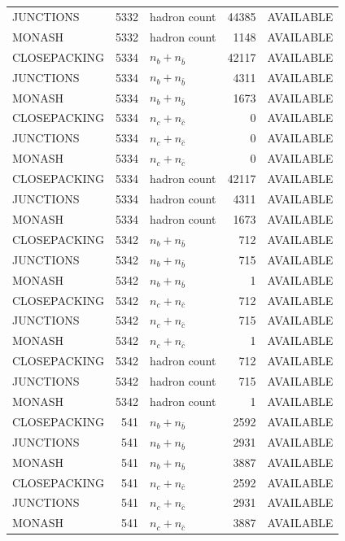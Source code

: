 \begin{landscape}
\begin{longtable}{@{}lrlrl@{}}
JUNCTIONS & 5332 & hadron count & \num{44385} & AVAILABLE \\
MONASH & 5332 & hadron count & \num{1148} & AVAILABLE \\
CLOSEPACKING & 5334 & $n_b+n_{\bar b}$ & \num{42117} & AVAILABLE \\
JUNCTIONS & 5334 & $n_b+n_{\bar b}$ & \num{4311} & AVAILABLE \\
MONASH & 5334 & $n_b+n_{\bar b}$ & \num{1673} & AVAILABLE \\
CLOSEPACKING & 5334 & $n_c+n_{\bar c}$ & \num{0} & AVAILABLE \\
JUNCTIONS & 5334 & $n_c+n_{\bar c}$ & \num{0} & AVAILABLE \\
MONASH & 5334 & $n_c+n_{\bar c}$ & \num{0} & AVAILABLE \\
CLOSEPACKING & 5334 & hadron count & \num{42117} & AVAILABLE \\
JUNCTIONS & 5334 & hadron count & \num{4311} & AVAILABLE \\
MONASH & 5334 & hadron count & \num{1673} & AVAILABLE \\
CLOSEPACKING & 5342 & $n_b+n_{\bar b}$ & \num{712} & AVAILABLE \\
JUNCTIONS & 5342 & $n_b+n_{\bar b}$ & \num{715} & AVAILABLE \\
MONASH & 5342 & $n_b+n_{\bar b}$ & \num{1} & AVAILABLE \\
CLOSEPACKING & 5342 & $n_c+n_{\bar c}$ & \num{712} & AVAILABLE \\
JUNCTIONS & 5342 & $n_c+n_{\bar c}$ & \num{715} & AVAILABLE \\
MONASH & 5342 & $n_c+n_{\bar c}$ & \num{1} & AVAILABLE \\
CLOSEPACKING & 5342 & hadron count & \num{712} & AVAILABLE \\
JUNCTIONS & 5342 & hadron count & \num{715} & AVAILABLE \\
MONASH & 5342 & hadron count & \num{1} & AVAILABLE \\
CLOSEPACKING & 541 & $n_b+n_{\bar b}$ & \num{2592} & AVAILABLE \\
JUNCTIONS & 541 & $n_b+n_{\bar b}$ & \num{2931} & AVAILABLE \\
MONASH & 541 & $n_b+n_{\bar b}$ & \num{3887} & AVAILABLE \\
CLOSEPACKING & 541 & $n_c+n_{\bar c}$ & \num{2592} & AVAILABLE \\
JUNCTIONS & 541 & $n_c+n_{\bar c}$ & \num{2931} & AVAILABLE \\
MONASH & 541 & $n_c+n_{\bar c}$ & \num{3887} & AVAILABLE \\

\end{longtable}
\end{landscape}
